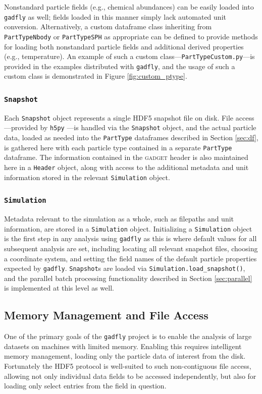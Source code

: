 \documentclass{thesis}
\newcommand{\code}[1]{\texttt{#1}}
\begin{document}
Nonstandard particle fields (e.g., chemical abundances) can be easily loaded into \code{gadfly} as well; fields loaded in this manner simply lack automated unit conversion.
Alternatively, a custom dataframe class inheriting from \code{PartTypeNbody} or \code{PartTypeSPH} as appropriate can be defined to provide methods for loading both nonstandard particle fields and additional derived properties (e.g., temperature). An example of such a custom class---\code{PartTypeCustom.py}---is provided in the examples distributed with \code{gadfly}, and the usage of such a custom class is demonstrated in Figure \ref{fig:custom_ptype}.

\subsubsection{\code{Snapshot}}
\label{sec:snap}
Each \code{Snapshot} object represents a single HDF5 snapshot file on disk.  File access---provided by \code{h5py} \citep{h5py}---is handled via the \code{Snapshot} object, and the actual particle data, loaded as needed into the \code{PartType} dataframes described in Section \ref{sec:df}, is gathered here with each particle type contained in a separate \code{PartType} dataframe.  
The information contained in the \textsc{gadget} header is also maintained here in a \code{Header} object, along with access to the additional metadata and unit information stored in the relevant \code{Simulation} object.

\subsubsection{\code{Simulation}}
\label{sec:sim}
Metadata relevant to the simulation as a whole, such as filepaths and unit information, are stored in a \code{Simulation} object.  Initializing a \code{Simulation} object is the first step in any analysis using \code{gadfly} as this is where default values for all subsequent analysis are set, including locating all relevant snapshot files, choosing a coordinate system, and setting the field names of the default particle properties expected by \code{gadfly}.  \code{Snapshot}s are loaded via \verb|Simulation.load_snapshot()|, and the parallel batch processing functionality described in Section \ref{sec:parallel} is implemented at this level as well.

\subsection{Memory Management and File Access}
\label{sec:fileIO}
One of the primary goals of the \code{gadfly} project is to enable the analysis of large datasets on machines with limited memory.
Enabling this requires intelligent memory management, loading only the particle data of interest from the disk.
Fortunately the HDF5 protocol is well-suited to such non-contiguous file access, allowing not only individual data fields to be accessed independently, but also for  loading only select entries from the field in question.
\end{document}
